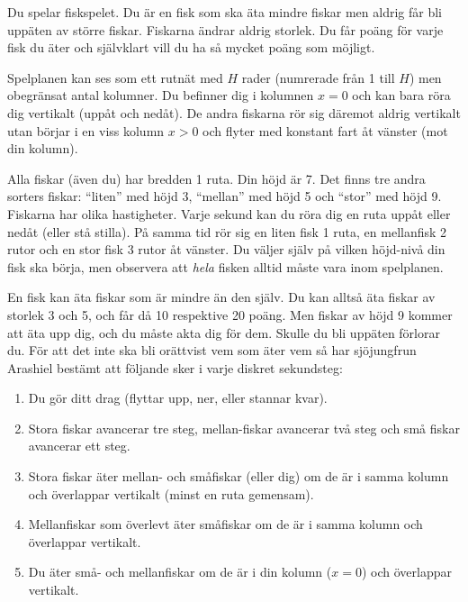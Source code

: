Du spelar fiskspelet. Du är en fisk som ska äta mindre fiskar men aldrig får
bli uppäten av större fiskar. Fiskarna ändrar aldrig storlek. Du får poäng för varje fisk du äter och självklart vill du ha så mycket
poäng som möjligt.

Spelplanen kan ses som ett rutnät med $H$ rader (numrerade från 1 till $H$) men obegränsat antal kolumner. Du befinner dig i kolumnen $x=0$ och kan bara röra dig vertikalt (uppåt och nedåt). De andra fiskarna rör sig däremot aldrig vertikalt utan börjar i en viss kolumn $x>0$ och flyter med konstant fart åt vänster (mot din kolumn). 

Alla fiskar (även du) har bredden 1 ruta. Din höjd är 7. Det finns tre andra sorters fiskar: ``liten'' med höjd 3, ``mellan'' med höjd 5 och ``stor'' med höjd 9. Fiskarna har olika hastigheter. Varje sekund kan du röra dig en ruta uppåt eller nedåt (eller stå stilla). På samma tid rör sig en liten fisk 1 ruta, en mellanfisk 2 rutor och en stor fisk 3 rutor åt vänster. Du väljer själv på vilken höjd-nivå din fisk ska börja, men observera att \emph{hela} fisken alltid måste vara inom spelplanen. 


En fisk kan äta fiskar som är mindre än den själv. Du kan alltså äta fiskar av storlek 3 och 5, och får då 10 respektive 20 poäng. Men fiskar av höjd 9 kommer att äta upp dig, och du måste akta dig för dem. Skulle du bli uppäten förlorar du. För att det inte ska bli orättvist vem som
äter vem så har sjöjungfrun Arashiel bestämt att följande sker i varje diskret
sekundsteg:
\begin{enumerate}
  \item
     Du gör ditt drag (flyttar upp, ner, eller stannar kvar).
  \item
     Stora fiskar avancerar tre steg, mellan-fiskar avancerar två steg och små fiskar avancerar ett steg.
  \item
     Stora fiskar äter mellan- och småfiskar (eller dig) om de är i samma kolumn och överlappar vertikalt (minst en ruta gemensam).
  \item
     Mellanfiskar som överlevt äter småfiskar om de är i samma kolumn och överlappar vertikalt.
  \item
     Du äter små- och mellanfiskar om de är i din kolumn ($x=0$) och överlappar vertikalt.
\end{enumerate}


